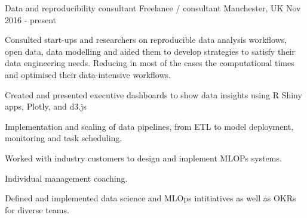 \begin{cventries}
\cventry
{Data and reproducibility consultant } %
{Freelance / consultant } %
{Manchester,  UK} %
{Nov 2016 - present } %
{ %
\begin{cvitems}
\item {Consulted start-ups and researchers on reproducible data analysis workflows, open data, data modelling and aided them to develop strategies to satisfy their data engineering needs. Reducing in most of the cases the computational times and optimised their data-intensive workflows.}
 \item {Created and presented executive dashboards to show data insights using R Shiny apps, Plotly, and d3.js}
 \item {Implementation and scaling of data pipelines, from ETL to model deployment, monitoring and task scheduling.}
 \item{Worked with industry customers to design and implement MLOPs systems.}
 \item {Individual management coaching.}
 \item {Defined and implemented data science and MLOps intitiatives as well as OKRs for diverse teams.}
\end{cvitems}
}




\end{cventries}
